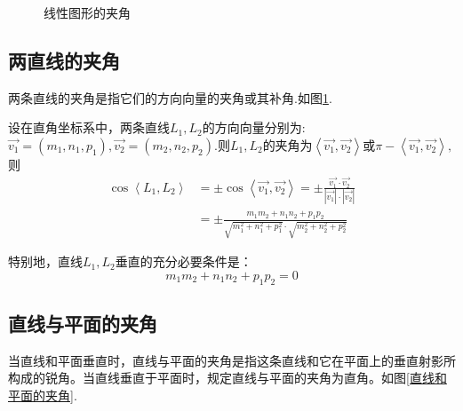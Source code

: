 \begin{figure}[h]
{\begin{minipage}[b]{0.2\linewidth}
			\label{两直线的夹角}
		\end{minipage}
	}
						\caption{线性图形的夹角}
\end{figure}
\subsection{两直线的夹角}
\quad 两条{\color{dy}直线的夹角}是指它们的方向向量的夹角或其补角.如图\ref{两直线的夹角}.

\theorem[两直线的夹角]
\quad 设在{\color{dy}直角坐标系}中，两条直线$L_1,L_2$的方向向量分别为:$\overrightarrow{v_1}=(m_1,n_1,p_1),\overrightarrow{v_2}=(m_2,n_2,p_2).$则$L_1,L_2$的夹角为$\left\langle \overrightarrow{v_1},\overrightarrow{v_2}\right\rangle $或$\pi -\left\langle \overrightarrow{v_1},\overrightarrow{v_2}\right\rangle ,$则
\begin{equation}
\begin{split}
\cos \left\langle L_1,L_2\right\rangle &=\pm \cos \left\langle \overrightarrow{v_1},\overrightarrow{v_2}\right\rangle =\pm \frac{\overrightarrow{v_1}\cdot \overrightarrow{v_2}}{|\overrightarrow{v_1}|\cdot |\overrightarrow{v_2}|}\\
&=\pm \frac{m_1m_2+n_1n_2+p_1p_2}{\sqrt{m_1^2+n_1^2+p_1^2}\cdot \sqrt{m_2^2+n_2^2+p_2^2}}
\end{split}
\end{equation}


特别地，直线$L_1,L_2$垂直的充分必要条件是：
\begin{equation}
m_1m_2+n_1n_2+p_1p_2=0
\end{equation}

\subsection{直线与平面的夹角}
\quad 当直线和平面垂直时，{\color{dy}直线与平面的夹角}是指这条直线和它在平面上的垂直射影所构成的{\color{dy2}锐角}。当直线垂直于平面时，规定{\color{dy}直线与平面的夹角}为{\color{dy2}直角}。如图\ref{直线和平面的夹角}.

